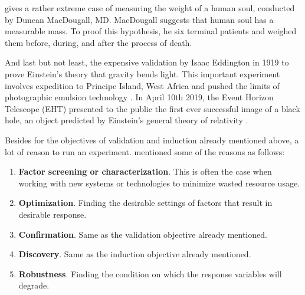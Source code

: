 
\citet{ryanModernExperimentalDesign2007a} gives a rather extreme case of measuring the weight of a human soul, conducted by Duncan MacDougall, MD.
MacDougall suggests that human soul has a measurable mass.
To proof this hypothesis, he  six terminal patients and weighed them before, during, and after the process of death.

And last but not least,  the expensive validation by Isaac Eddington in 1919 to prove Einstein's theory that gravity bends light.
This important experiment involves expedition to Principe Island, West Africa and pushed the limits of photographic emulsion technology \citep{tichyShouldComputerScientists1998}.
In April 10th 2019, the Event Horizon Telescope (EHT) presented to the public the first ever successful image of a black hole, an object predicted by Einstein's general theory of relativity \citep{akiyama2019first}.

Besides for the objectives of validation and induction already mentioned above,  a lot of reason to run an experiment.
\citet{montgomeryDesignAnalysisExperiments2013} mentioned some of the reasons as follows:
\begin {enumerate}[noitemsep]
	\item \textbf{Factor screening or characterization}. This is often the case when working with new systems or technologies to minimize wasted resource usage.
	\item \textbf{Optimization}. Finding the desirable settings of factors that result in desirable response.
	\item \textbf{Confirmation}. Same as the validation objective already mentioned.
	\item \textbf{Discovery}. Same as the induction objective already mentioned.
	\item \textbf{Robustness}. Finding the condition on which the response variables will degrade.
\end{enumerate}

